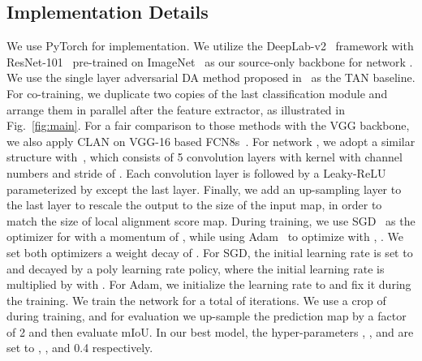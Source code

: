 \documentclass[10pt,twocolumn,letterpaper]{article}
\begin{document}
\subsection{Implementation Details}
We use PyTorch for implementation. We utilize the DeepLab-v2~\cite{chen2018deeplab} framework with ResNet-101~\cite{he2016resnet} pre-trained on ImageNet~\cite{deng2009imagenet} as our source-only backbone for network . We use the single layer adversarial DA method proposed in~\cite{tsai2018OutputSpace} as the TAN baseline. For co-training, we duplicate two copies of the last classification module and arrange them in parallel after the feature extractor, as illustrated in Fig.~\ref{fig:main}. For a fair comparison to those methods with the VGG backbone, we also apply CLAN on VGG-16 based FCN8s~\cite{long2015fcn}. For network , we adopt a similar structure with~\cite{radford2015unsupervised}, which consists of 5 convolution layers with kernel  with channel numbers  and stride of . Each convolution layer is followed by a Leaky-ReLU~\cite{maas2013ReLU} parameterized by  except the last layer. Finally, we add an up-sampling layer to the last layer to rescale the output to the size of the input map, in order to match the size of local alignment score map. During training, we use SGD~\cite{bottou2010SGD} as the optimizer for  with a momentum of , while using Adam~\cite{kingma2014adam} to optimize  with , . We set both optimizers a weight decay of . For SGD, the initial learning rate is set to  and decayed by a poly learning rate policy, where the initial learning rate is multiplied by  with . For Adam, we initialize the learning rate to  and fix it during the training. We train the network for a total of  iterations. We use a crop of  during training, and for evaluation we up-sample the prediction map by a factor of 2 and then evaluate mIoU. In our best model, the hyper-parameters , ,  and  are set to , ,  and 0.4 respectively.
\end{document}
